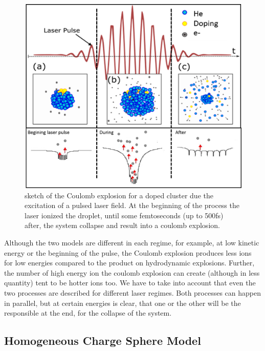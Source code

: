 {\begin{figure}[h!]
\centering
\includegraphics[width=14cm]{../Images/cluster_regimes_2.png}
\caption{sketch of the Coulomb explosion for a doped cluster due the excitation of a pulsed laser field. At the beginning of the process the laser ionized the droplet, until some femtoseconds (up to 500fs) after, the system collapse and result into a coulomb explosion.}
\label{fig:columbexplosion}

\end{figure}


Although the two models are different in each regime, for example, at low kinetic energy or the beginning of the pulse, the Coulomb explosion produces less ions for low energies compared to the product on hydrodynamic explosions. Further, the number of high energy ion the coulomb explosion can create (although in less quantity) tent to be hotter ions too.
We have to take into account that even the two processes are described for different laser regimes. Both processes can happen in parallel, but at certain energies is clear, that one or the other will be the responsible at the end, for the collapse of the system.

\subsection{Homogeneous Charge Sphere  Model}

}
